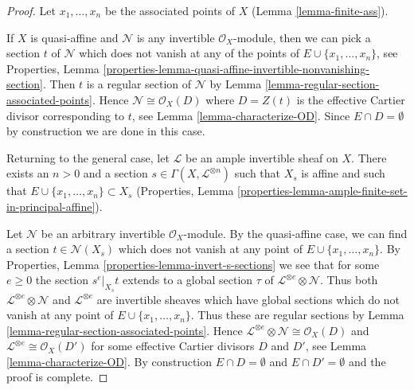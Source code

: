 \begin{proof}
Let $x_1, \ldots, x_n$ be the associated points of $X$
(Lemma \ref{lemma-finite-ass}).

\medskip\noindent
If $X$ is quasi-affine and $\mathcal{N}$ is any invertible
$\mathcal{O}_X$-module, then we can pick a section $t$ of
$\mathcal{N}$ which does not vanish at any of the points
of $E \cup \{x_1, \ldots, x_n\}$, see Properties, Lemma
\ref{properties-lemma-quasi-affine-invertible-nonvanishing-section}.
Then $t$ is a regular section of $\mathcal{N}$ by
Lemma \ref{lemma-regular-section-associated-points}.
Hence $\mathcal{N} \cong \mathcal{O}_X(D)$ where
$D = Z(t)$ is the effective Cartier divisor corresponding to $t$, see
Lemma \ref{lemma-characterize-OD}. Since $E \cap D = \emptyset$
by construction we are done in this case.

\medskip\noindent
Returning to the general case, let $\mathcal{L}$ be an ample invertible sheaf
on $X$. There exists an $n > 0$ and a section
$s \in \Gamma(X, \mathcal{L}^{\otimes n})$ such that $X_s$
is affine and such that $E \cup \{x_1, \ldots, x_n\} \subset X_s$
(Properties, Lemma \ref{properties-lemma-ample-finite-set-in-principal-affine}).

\medskip\noindent
Let $\mathcal{N}$ be an arbitrary invertible $\mathcal{O}_X$-module.
By the quasi-affine case, we can find a section
$t \in \mathcal{N}(X_s)$ which does not vanish at any point
of $E \cup \{x_1, \ldots, x_n\}$.
By Properties, Lemma \ref{properties-lemma-invert-s-sections}
we see that for some $e \geq 0$ the section $s^e|_{X_s} t$ extends to
a global section $\tau$ of $\mathcal{L}^{\otimes e} \otimes \mathcal{N}$.
Thus both $\mathcal{L}^{\otimes e} \otimes \mathcal{N}$ and
$\mathcal{L}^{\otimes e}$ are invertible sheaves which have global sections
which do not vanish at any point of $E \cup \{x_1, \ldots, x_n\}$.
Thus these are regular sections by
Lemma \ref{lemma-regular-section-associated-points}.
Hence $\mathcal{L}^{\otimes e} \otimes \mathcal{N} \cong \mathcal{O}_X(D)$
and $\mathcal{L}^{\otimes e} \cong \mathcal{O}_X(D')$ for some
effective Cartier divisors $D$ and $D'$, see Lemma \ref{lemma-characterize-OD}.
By construction $E \cap D = \emptyset$ and $E \cap D' = \emptyset$
and the proof is complete.
\end{proof}

